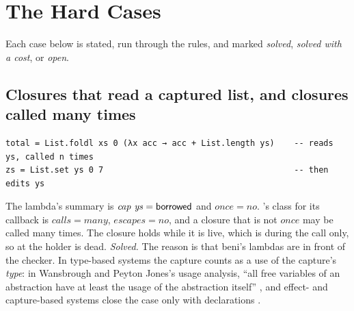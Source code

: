\section{The Hard Cases}
\label{sec:hard}

Each case below is stated, run through the rules, and marked \emph{solved}, \emph{solved with a
cost}, or \emph{open}.

\subsection{Closures that read a captured list, and closures called many times}
\label{sec:hard-closures}

\begin{Verbatim}
total = List.foldl xs 0 (λx acc → acc + List.length ys)    -- reads ys, called n times
zs = List.set ys 0 7                                       -- then edits ys
\end{Verbatim}
The lambda's summary is $\mathit{cap}\ \mathit{ys} = \borrowed$ and $\mathit{once} = \mathit{no}$.
's class for its callback is $\mathit{calls} = \mathit{many}$, $\mathit{escapes} =
\mathit{no}$, and a closure that is not $\mathit{once}$ may be called many times. The closure holds
 while it is live, which is during the  call only, so at  the
holder is dead. \emph{Solved.} The reason is that beni's lambdas are in front of the checker. In
type-based systems the capture counts as a use of the capture's \emph{type}: in Wansbrough and Peyton
Jones's usage analysis, ``all free variables of an abstraction have at least the usage of the
abstraction itself'' \citep[\S6.1]{wansbrough1999once}, and effect- and capture-based systems close
the case only with declarations \citep{deng2025capture,xu2026capybara,radanne2020kindly}.

